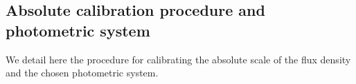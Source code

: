


\subsection{Absolute calibration procedure and photometric system}
\label{se:calibration_method}

We detail here the procedure for calibrating the absolute scale of
the flux density and the chosen photometric system.


